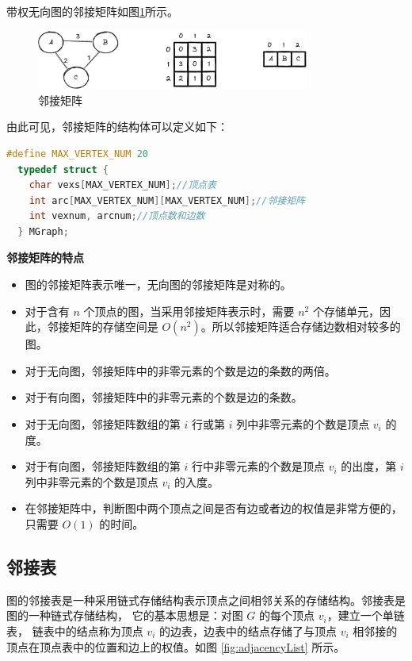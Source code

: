\documentclass[lang=cn,newtx,10pt,scheme=chinese]{elegantbook}
\begin{document}
带权无向图的邻接矩阵如图\ref{fig:adjacencyMatrix_WeightedUndirected}所示。
\begin{figure}[h!]
  \centering
  \includegraphics[width=0.8\textwidth]{./figure/pdf/cropped/adjacencyMatrix_weightUnDirected.pdf}
  \caption{邻接矩阵}
  \label{fig:adjacencyMatrix_WeightedUndirected}
\end{figure}

由此可见，邻接矩阵的结构体可以定义如下：

\begin{lstlisting}[language=C++, caption={邻接矩阵结构体}]
  #define MAX_VERTEX_NUM 20
  typedef struct {
    char vexs[MAX_VERTEX_NUM];//顶点表
    int arc[MAX_VERTEX_NUM][MAX_VERTEX_NUM];//邻接矩阵
    int vexnum, arcnum;//顶点数和边数
  } MGraph;
\end{lstlisting}

\textbf{邻接矩阵的特点}

\begin{itemize}
  \item 图的邻接矩阵表示唯一，无向图的邻接矩阵是对称的。
  \item 对于含有 $n$ 个顶点的图，当采用邻接矩阵表示时，需要 $n^2$ 个存储单元，因此，邻接矩阵的存储空间是 $O(n^2)$。所以邻接矩阵适合存储边数相对较多的图。
  \item 对于无向图，邻接矩阵中的非零元素的个数是边的条数的两倍。
  \item 对于有向图，邻接矩阵中的非零元素的个数是边的条数。
  \item 对于无向图，邻接矩阵数组的第 $i$ 行或第 $i$ 列中非零元素的个数是顶点 $v_i$ 的度。
  \item 对于有向图，邻接矩阵数组的第 $i$ 行中非零元素的个数是顶点 $v_i$ 的出度，第 $i$ 列中非零元素的个数是顶点 $v_i$ 的入度。
  \item 在邻接矩阵中，判断图中两个顶点之间是否有边或者边的权值是非常方便的，只需要 $O(1)$ 的时间。
  \end{itemize}


\subsection{邻接表}
图的邻接表是一种采用链式存储结构表示顶点之间相邻关系的存储结构。邻接表是图的一种链式存储结构，
它的基本思想是：对图 $G$ 的每个顶点 $v_i$，建立一个单链表，
链表中的结点称为顶点 $v_i$ 的边表，边表中的结点存储了与顶点 $v_i$ 相邻接的顶点在顶点表中的位置和边上的权值。如图 \ref{fig:adjacencyList} 所示。
\end{document}

